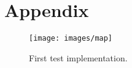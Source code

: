\documentclass[12pt]{article}
\numberwithin{equation}{section} %
\numberwithin{figure}{section} %
\numberwithin{table}{section} %
\begin{document}
\section{Appendix}	
	\begin{figure}[H]
		\centering		
		\texttt{[image: images/map]}
		\caption{First test implementation.}
		\label{fig:map}
	\end{figure}
%
%	
%	
%
%	
%	
%	
\end{document}
